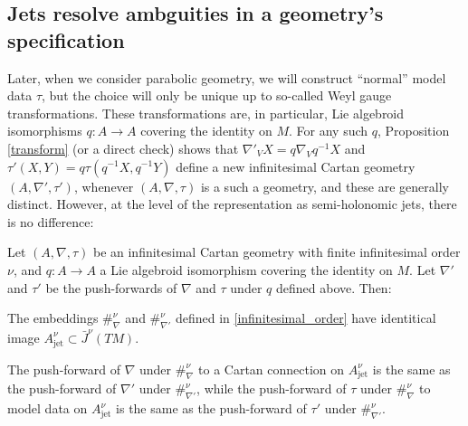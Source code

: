 \documentclass[leqno,12pt]{amsart} %
\begin{document}
\subsection{Jets resolve ambguities in a geometry's specification}\label{resolve}
Later, when we consider parabolic geometry, we will construct ``normal'' model data
$\tau $, but the choice will only be unique up to so-called Weyl gauge transformations.
These transformations are, in particular, Lie algebroid isomorphisms
$q \colon A \rightarrow A$ covering the identity on $M$. For any such $q$, Proposition
\ref{transform} (or a direct check) shows that $\nabla'_VX=q \nabla_Vq^{-1}X $ and
$\tau'(X, Y) = q \tau(q^{-1}X, q^{-1}Y)$ define a new infinitesimal Cartan geometry
$(A, \nabla', \tau')$, whenever $(A, \nabla, \tau)$ is a such a geometry, and these are
generally distinct.  However, at the level of the representation as semi-holonomic jets,
there is no difference:

\begin{proposition}
  Let $(A, \nabla, \tau)$ be an infinitesimal Cartan geometry with finite infinitesimal
  order $\nu$, and $q \colon A \rightarrow A$ a Lie algebroid isomorphism covering the
  identity on $M$. Let $\nabla'$ and $\tau'$ be the push-forwards of $\nabla $ and $\tau$
  under $q$ defined above. Then:
  \begin{conditions}
  \item\label{partita1} The embeddings $\#_\nabla^\nu$ and $\#_{\nabla'}^\nu$ defined in
    \ref{infinitesimal_order} have identitical image
    $A_\mathrm{jet}^\nu \subset \bar J^\nu(TM)$.
  \item\label{partita2} The push-forward of $\nabla $ under $\#_\nabla^\nu $ to a Cartan connection on
    $A_\mathrm{jet}^\nu$ is the same as the push-forward of $\nabla'$ under
    $\#_{\nabla'}^\nu$, while the push-forward of $\tau$ under $\#_\nabla^\nu $ to model
    data on $A_\mathrm{jet}^\nu$ is the same as the push-forward of $\tau'$ under
    $\#_{\nabla'}^\nu $.
  \end{conditions}
\end{proposition}
\end{document}
